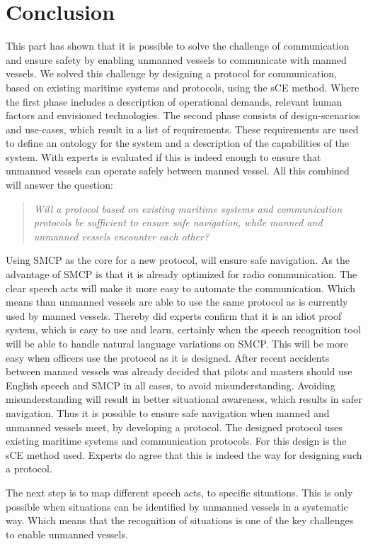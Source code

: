 \chapter{Conclusion}
This part has shown that it is possible to solve the challenge of communication and ensure safety by enabling unmanned vessels to communicate with manned vessels. We solved this challenge by designing a protocol for communication, based on existing maritime systems and protocols, using the \acf{sCE} method. Where the first phase includes a description of operational demands, relevant human factors and envisioned technologies. The second phase consists of design-scenarios and use-cases, which result in a list of requirements. These requirements are used to define an ontology for the system and a description of the capabilities of the system. With experts is evaluated if this is indeed enough to ensure that unmanned vessels can operate safely between manned vessel. All this combined will answer the question:

\begin{quotation}
	\emph{Will a protocol based on existing maritime systems and communication protocols be sufficient to ensure safe navigation, while manned and unmanned vessels encounter each other?}
\end{quotation}

Using \acf{SMCP} as the core for a new protocol, will ensure safe navigation. As the advantage of \ac{SMCP} is that it is already optimized for radio communication. The clear speech acts will make it more easy to automate the communication. Which means than unmanned vessels are able to use the same protocol as is currently used by manned vessels. Thereby did experts confirm that it is an idiot proof system, which is easy to use and learn, certainly when the speech recognition tool will be able to handle natural language variations on \ac{SMCP}.
This will be more easy when officers use the protocol as it is designed. After recent accidents between manned vessels was already decided that pilots and masters should use English speech and \ac{SMCP} in all cases, to avoid misunderstanding. Avoiding misunderstanding will result in better situational awareness, which results in safer navigation.
Thus it is possible to ensure safe navigation when manned and unmanned vessels meet, by developing a protocol. The designed protocol uses existing maritime systems and communication protocols. For this design is the \acf{sCE} method used. Experts do agree that this is indeed the way for designing such a protocol.

The next step is to map different speech acts, to specific situations. This is only possible when situations can be identified by unmanned vessels in a systematic way. Which means that the recognition of situations is one of the key challenges to enable unmanned vessels. 